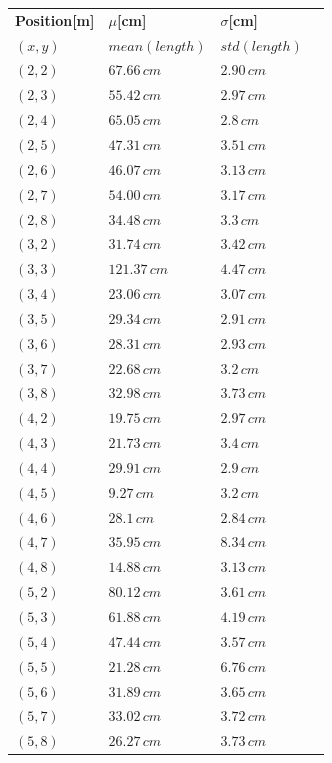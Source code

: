 \documentclass[conference, a4paper]{IEEEtran}
\begin{document}
\begin{table}[hbt!]
	\centering
	\begin{tabular}{l l l c}
		\textbf{Position[m]} & \textbf{$\mu$[cm]} & \textbf{$\sigma$[cm]}\\
		$(x,y)$ & $mean(length)$ & $std(length)$\\
		$(2,2)$ & $67.66\,cm$ & $2.90\,cm$\\
		$(2,3)$ & $55.42\,cm$ & $2.97\,cm$\\
		$(2,4)$ & $65.05\,cm$ & $2.8\,cm$\\
		$(2,5)$ & $47.31\,cm$ & $3.51\,cm$\\
		$(2,6)$ & $46.07\,cm$ & $3.13\,cm$\\
		$(2,7)$ & $54.00\,cm$ & $3.17\,cm$\\
		$(2,8)$ & $34.48\,cm$ & $3.3\,cm$\\
		
		$(3,2)$ & $31.74\,cm$ & $3.42\,cm$\\
		$(3,3)$ & $121.37\,cm$ & $4.47\,cm$\\
		$(3,4)$ & $23.06\,cm$ & $3.07\,cm$\\
		$(3,5)$ & $29.34\,cm$ & $2.91\,cm$\\
		$(3,6)$ & $28.31\,cm$ & $2.93\,cm$\\
		$(3,7)$ & $22.68\,cm$ & $3.2\,cm$\\
		$(3,8)$ & $32.98\,cm$ & $3.73\,cm$\\
		
		$(4,2)$ & $19.75\,cm$ & $2.97\,cm$\\
		$(4,3)$ & $21.73\,cm$ & $3.4\,cm$\\
		$(4,4)$ & $29.91\,cm$ & $2.9\,cm$\\
		$(4,5)$ & $9.27\,cm$ & $3.2\,cm$\\
		$(4,6)$ & $28.1\,cm$ & $2.84\,cm$\\
		$(4,7)$ & $35.95\,cm$ & $8.34\,cm$\\
		$(4,8)$ & $14.88\,cm$ & $3.13\,cm$\\
		
		$(5,2)$ & $80.12\,cm$ & $3.61\,cm$\\
		$(5,3)$ & $61.88\,cm$ & $4.19\,cm$\\
		$(5,4)$ & $47.44\,cm$ & $3.57\,cm$\\
		$(5,5)$ & $21.28\,cm$ & $6.76\,cm$\\
		$(5,6)$ & $31.89\,cm$ & $3.65\,cm$\\
		$(5,7)$ & $33.02\,cm$ & $3.72\,cm$\\
		$(5,8)$ & $26.27\,cm$ & $3.73\,cm$\\
		

\end{tabular}
\end{table}
\end{document}
